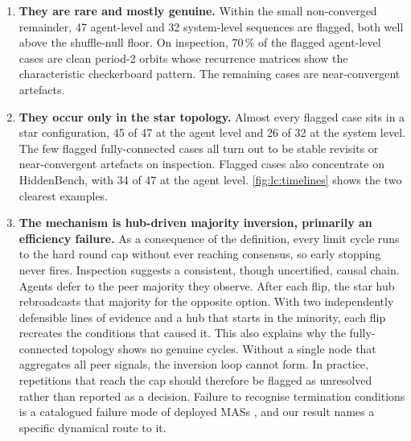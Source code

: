 \begin{enumerate}
\renewcommand{\labelenumi}{(\roman{enumi})}
  \item \textbf{They are rare and mostly genuine.} Within the small non-converged remainder,
        47 agent-level and 32 system-level sequences are flagged, both well above the
        shuffle-null floor. On inspection, $70\,\%$ of the flagged agent-level cases
        are clean period-2 orbits whose recurrence matrices show the characteristic
        checkerboard pattern. The remaining cases are near-convergent artefacts.

  \item \textbf{They occur only in the star topology.} Almost every flagged case sits
        in a star configuration, 45 of 47 at the agent level and 26 of 32 at the
        system level. The few flagged fully-connected cases all turn out to be stable
        revisits or near-convergent artefacts on inspection. Flagged cases also
        concentrate on HiddenBench, with 34 of 47 at the agent level.
        \autoref{fig:lc:timelines} shows the two clearest examples.

  \item \textbf{The mechanism is hub-driven majority inversion, primarily an efficiency
        failure.} As a consequence of the definition, every limit cycle runs to the hard round cap without ever reaching
        consensus, so early stopping never fires. Inspection suggests a consistent,
        though uncertified, causal chain. Agents defer to the peer majority they
        observe. After each flip, the star hub rebroadcasts that majority for the
        opposite option. With two independently defensible lines of evidence and a
        hub that starts in the minority, each flip recreates the conditions that
        caused it. This also explains why the fully-connected topology shows no
        genuine cycles. Without a single node that aggregates all peer signals, the
        inversion loop cannot form. In practice, repetitions that reach the cap
        should therefore be flagged as unresolved rather than reported as a
        decision. Failure to recognise termination conditions is a catalogued failure
        mode of deployed \acp{MAS} \citep{cemri2025mast}, and our result
        names a specific dynamical route to it.
\end{enumerate}

